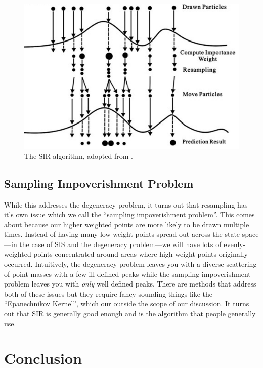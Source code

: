 \documentclass{article}
\begin{document}
\begin{figure}
\centering
\includegraphics[scale=.25]{sir}
\caption{The SIR algorithm, adopted from \cite{sirfig}.}
\label{fig:sir}
\end{figure}

\subsection{Sampling Impoverishment Problem}
While this addresses the degeneracy problem, it turns out that resampling has it's own issue which we call the ``sampling impoverishment problem''. This comes about because our higher weighted points are more likely to be drawn multiple times. Instead of having many low-weight points spread out across the state-space---in the case of SIS and the degeneracy problem---we will have lots of evenly-weighted points concentrated around areas where high-weight points originally occurred. Intuitively, the degeneracy problem leaves you with a diverse scattering of point masses with a few ill-defined peaks while the sampling impoverishment problem leaves you with \textit{only} well defined peaks. There are methods that address both of these issues but they require fancy sounding things like the ``Epanechnikov Kernel'', which our outside the scope of our discussion. It turns out that SIR is generally good enough and is the algorithm that people generally use.

\FloatBarrier
\section{Conclusion}



\end{document}
